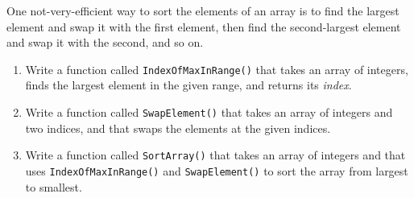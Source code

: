 
\begin{exercise}
	
	One not-very-efficient way to sort the elements of an array
	is to find the largest element and swap it with the first
	element, then find the second-largest element and swap it with
	the second, and so on.
	
	\begin{enumerate}
		
		\item Write a function called {\tt IndexOfMaxInRange()} that 
		takes an array of integers, finds the
		largest element in the given range, and returns its {\em index}.
		
		\item Write a function called {\tt SwapElement()} that takes an
		array of integers and two indices, and that swaps the elements
		at the given indices.
		
		\item Write a function called {\tt SortArray()} that takes an array of
		integers and that uses {\tt IndexOfMaxInRange()} and {\tt SwapElement()}
		to sort the array from largest to smallest.
		
	\end{enumerate}
\end{exercise}




